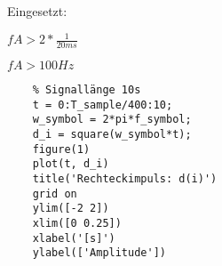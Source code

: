 \documentclass{article}
\begin{document}
Eingesetzt:
\begin{center}
$fA > 2*\frac{1}{20ms}$
\end{center}
\begin{center}
$fA > 100Hz$   
\end{center}
\begin{verbatim}
    % Signallänge 10s
    t = 0:T_sample/400:10;
    w_symbol = 2*pi*f_symbol;
    d_i = square(w_symbol*t);
    figure(1)
    plot(t, d_i)
    title('Rechteckimpuls: d(i)')
    grid on
    ylim([-2 2])
    xlim([0 0.25])
    xlabel('[s]')
    ylabel(['Amplitude'])
\end{verbatim}





\end{document}
